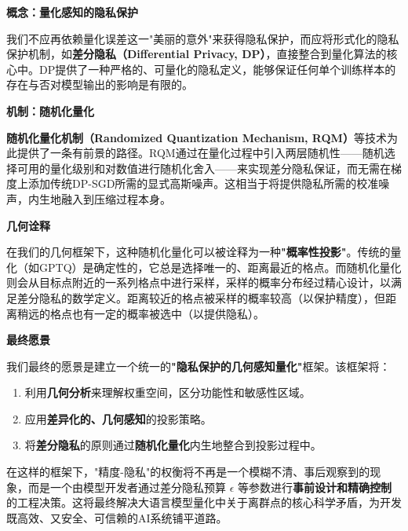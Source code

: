 \documentclass[letterpaper,twocolumn,10pt]{article}
\begin{document}
\textbf{概念：量化感知的隐私保护}

我们不应再依赖量化误差这一"美丽的意外"来获得隐私保护，而应将形式化的隐私保护机制，如\textbf{差分隐私（Differential Privacy, DP）}，直接整合到量化算法的核心中。DP提供了一种严格的、可量化的隐私定义，能够保证任何单个训练样本的存在与否对模型输出的影响是有限的。

\textbf{机制：随机化量化}

\textbf{随机化量化机制（Randomized Quantization Mechanism, RQM）}等技术为此提供了一条有前景的路径。RQM通过在量化过程中引入两层随机性——随机选择可用的量化级别和对数值进行随机化舍入——来实现差分隐私保证，而无需在梯度上添加传统DP-SGD所需的显式高斯噪声。这相当于将提供隐私所需的校准噪声，内生地融入到压缩过程本身。

\textbf{几何诠释}

在我们的几何框架下，这种随机化量化可以被诠释为一种\textbf{"概率性投影"}。传统的量化（如GPTQ）是确定性的，它总是选择唯一的、距离最近的格点。而随机化量化则会从目标点附近的一系列格点中进行采样，采样的概率分布经过精心设计，以满足差分隐私的数学定义。距离较近的格点被采样的概率较高（以保护精度），但距离稍远的格点也有一定的概率被选中（以提供隐私）。

\textbf{最终愿景}

我们最终的愿景是建立一个统一的\textbf{"隐私保护的几何感知量化"}框架。该框架将：

\begin{enumerate}
\item 利用\textbf{几何分析}来理解权重空间，区分功能性和敏感性区域。
\item 应用\textbf{差异化的、几何感知}的投影策略。
\item 将\textbf{差分隐私}的原则通过\textbf{随机化量化}内生地整合到投影过程中。
\end{enumerate}

在这样的框架下，"精度-隐私"的权衡将不再是一个模糊不清、事后观察到的现象，而是一个由模型开发者通过差分隐私预算 $\epsilon$ 等参数进行\textbf{事前设计和精确控制}的工程决策。这将最终解决大语言模型量化中关于离群点的核心科学矛盾，为开发既高效、又安全、可信赖的AI系统铺平道路。

% 
% 
\end{document}
